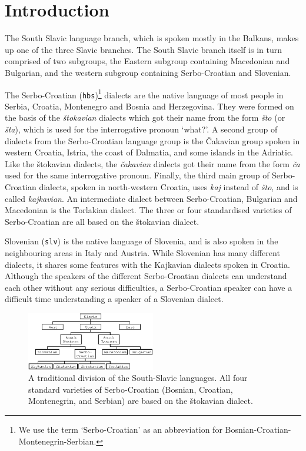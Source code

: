 
\section{Introduction}

The South Slavic language branch, which is spoken mostly in the
Balkans, makes up one of the three Slavic branches. The South Slavic
branch itself is in turn comprised of two subgroups, the Eastern subgroup
containing Macedonian and Bulgarian, and the western subgroup
containing Serbo-Croatian and Slovenian.

The Serbo-Croatian (\texttt{hbs})\footnote{We use the term `Serbo-Croatian' as an abbreviation for
Bosnian-Croatian-Montenegrin-Serbian.} 
dialects are the native language of most people in Serbia, Croatia, 
Montenegro and Bosnia and Herzegovina. They were formed on the basis of the \emph{štokavian} dialects 
which got their name from the form \emph{što} (or \emph{šta}), which is used for the 
interrogative pronoun `what?'. A second group of dialects from the Serbo-Croatian language group 
is the Čakavian group spoken in western Croatia, Istria, the coast of Dalmatia, and some 
islands in the Adriatic. Like the štokavian dialects, the \emph{čakavian} dialects got their name 
from the form \emph{ča} used for the same interrogative pronoun. Finally, the third main group 
of Serbo-Croatian dialects, spoken in north-western Croatia, uses \emph{kaj} instead of \emph{što}, 
and is called \emph{kajkavian}.
An intermediate dialect between Serbo-Croatian, Bulgarian and Macedonian is the Torlakian dialect.
The three or four standardised varieties of Serbo-Croatian are all based on the štokavian dialect.

Slovenian (\texttt{slv}) is the native language of Slovenia, and is also spoken in the neighbouring areas in Italy and Austria. While Slovenian has many different dialects, it shares some features with the Kajkavian dialects spoken in Croatia. Although the speakers of the different Serbo-Croatian dialects can understand each other without any serious difficulties, a Serbo-Croatian speaker can have a difficult time understanding a speaker of a Slovenian dialect.

\begin{figure}
\centering
\includegraphics[width=0.5\textwidth]{images/chart.eps}
\caption{A traditional division of the South-Slavic languages. All four standard varieties
     of Serbo-Croatian (Bosnian, Croatian, Montenegrin, and Serbian) are based on the 
     štokavian dialect.}
\end{figure}

